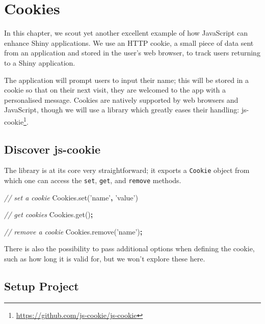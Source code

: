 \documentclass[10pt,]{krantz}
\makeatletter
\newenvironment{Shaded}{\begin{snugshade}}{\end{snugshade}}
\newcommand{\AttributeTok}[1]{\textcolor[rgb]{0.61,0.61,0.61}{#1}}
\newcommand{\CommentTok}[1]{\textcolor[rgb]{0.37,0.37,0.37}{\textit{#1}}}
\newcommand{\NormalTok}[1]{#1}
\newcommand{\OperatorTok}[1]{\textcolor[rgb]{0.43,0.43,0.43}{\textbf{#1}}}
\newcommand{\StringTok}[1]{\textcolor[rgb]{0.5,0.5,0.5}{#1}}
\newcommand{\VariableTok}[1]{\textcolor[rgb]{0,0,0}{#1}}
\renewcommand{\href}[2]{#2\footnote{\url{#1}}}
\newenvironment{kframe}{%
\medskip{}
\setlength{\fboxsep}{.8em}
 \def\at@end@of@kframe{}%
 \ifinner\ifhmode%
  \def\at@end@of@kframe{\end{minipage}}%
  \begin{minipage}{\columnwidth}%
 \fi\fi%
 \def\FrameCommand##1{\hskip\@totalleftmargin \hskip-\fboxsep
 \colorbox{shadecolor}{##1}\hskip-\fboxsep
     \hskip-\linewidth \hskip-\@totalleftmargin \hskip\columnwidth}%
 \MakeFramed {\advance\hsize-\width
   \@totalleftmargin\z@ \linewidth\hsize
   \@setminipage}}%
 {\par\unskip\endMakeFramed%
 \at@end@of@kframe}
\renewenvironment{Shaded}{\begin{kframe}}{\end{kframe}}
\makeatother
\begin{document}
\hypertarget{shiny-cookies}{%
\chapter{Cookies}\label{shiny-cookies}}

In this chapter, we scout yet another excellent example of how JavaScript can enhance Shiny applications. We use an HTTP cookie, a small piece of data sent from an application and stored in the user's web browser, to track users returning to a Shiny application.

The application will prompt users to input their name; this will be stored in a cookie so that on their next visit, they are welcomed to the app with a personalised message. Cookies are natively supported by web browsers and JavaScript, though we will use a library which greatly eases their handling: \href{https://github.com/js-cookie/js-cookie}{js-cookie}.

\hypertarget{shiny-cookies-discover}{%
\section{Discover js-cookie}\label{shiny-cookies-discover}}

The library is at its core very straightforward; it exports a \texttt{Cookie} object from which one can access the \texttt{set}, \texttt{get}, and \texttt{remove} methods.

\begin{Shaded}
\begin{Highlighting}[]
\CommentTok{// set a cookie}
\VariableTok{Cookies}\NormalTok{.}\AttributeTok{set}\NormalTok{(}\StringTok{'name'}\OperatorTok{,} \StringTok{'value'}\NormalTok{)}

\CommentTok{// get cookies}
\VariableTok{Cookies}\NormalTok{.}\AttributeTok{get}\NormalTok{()}\OperatorTok{;}

\CommentTok{// remove a cookie}
\VariableTok{Cookies}\NormalTok{.}\AttributeTok{remove}\NormalTok{(}\StringTok{'name'}\NormalTok{)}\OperatorTok{;}
\end{Highlighting}
\end{Shaded}

There is also the possibility to pass additional options when defining the cookie, such as how long it is valid for, but we won't explore these here.

\hypertarget{shiny-cookies-setup}{%
\section{Setup Project}\label{shiny-cookies-setup}}
\end{document}
